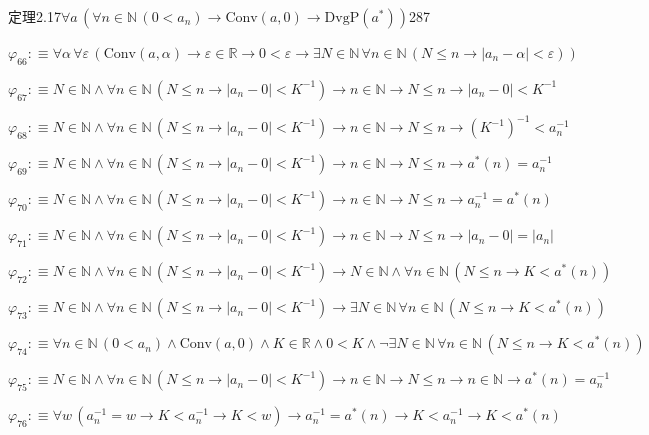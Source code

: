 \begin{fullproof}{定理2.17}{$\forall a\,(\forall n \in \mathbb{N}\,(0 < a_{n}) \to \mathrm{Conv}(a,0) \to \mathrm{DvgP}(a^{\ast}))$}{287}
\begin{abbrevlist}
\item $\varphi_{66} :\equiv \forall \alpha\,\forall \varepsilon\,(\mathrm{Conv}(a,\alpha) \to \varepsilon \in \mathbb{R} \to 0 < \varepsilon \to \exists N \in \mathbb{N}\,\forall n \in \mathbb{N}\,(N \leq n \to \lvert a_{n} - \alpha \rvert < \varepsilon))$
\item $\varphi_{67} :\equiv N \in \mathbb{N} \land \forall n \in \mathbb{N}\,(N \leq n \to \lvert a_{n} - 0 \rvert < K^{-1}) \to n \in \mathbb{N} \to N \leq n \to \lvert a_{n} - 0 \rvert < K^{-1}$
\item $\varphi_{68} :\equiv N \in \mathbb{N} \land \forall n \in \mathbb{N}\,(N \leq n \to \lvert a_{n} - 0 \rvert < K^{-1}) \to n \in \mathbb{N} \to N \leq n \to (K^{-1})^{-1} < a_{n}^{-1}$
\item $\varphi_{69} :\equiv N \in \mathbb{N} \land \forall n \in \mathbb{N}\,(N \leq n \to \lvert a_{n} - 0 \rvert < K^{-1}) \to n \in \mathbb{N} \to N \leq n \to a^{\ast}(n) = a_{n}^{-1}$
\item $\varphi_{70} :\equiv N \in \mathbb{N} \land \forall n \in \mathbb{N}\,(N \leq n \to \lvert a_{n} - 0 \rvert < K^{-1}) \to n \in \mathbb{N} \to N \leq n \to a_{n}^{-1} = a^{\ast}(n)$
\item $\varphi_{71} :\equiv N \in \mathbb{N} \land \forall n \in \mathbb{N}\,(N \leq n \to \lvert a_{n} - 0 \rvert < K^{-1}) \to n \in \mathbb{N} \to N \leq n \to \lvert a_{n} - 0 \rvert = \lvert a_{n} \rvert$
\item $\varphi_{72} :\equiv N \in \mathbb{N} \land \forall n \in \mathbb{N}\,(N \leq n \to \lvert a_{n} - 0 \rvert < K^{-1}) \to N \in \mathbb{N} \land \forall n \in \mathbb{N}\,(N \leq n \to K < a^{\ast}(n))$
\item $\varphi_{73} :\equiv N \in \mathbb{N} \land \forall n \in \mathbb{N}\,(N \leq n \to \lvert a_{n} - 0 \rvert < K^{-1}) \to \exists N \in \mathbb{N}\,\forall n \in \mathbb{N}\,(N \leq n \to K < a^{\ast}(n))$
\item $\varphi_{74} :\equiv \forall n \in \mathbb{N}\,(0 < a_{n}) \land \mathrm{Conv}(a,0) \land K \in \mathbb{R} \land 0 < K \land \neg \exists N \in \mathbb{N}\,\forall n \in \mathbb{N}\,(N \leq n \to K < a^{\ast}(n))$
\item $\varphi_{75} :\equiv N \in \mathbb{N} \land \forall n \in \mathbb{N}\,(N \leq n \to \lvert a_{n} - 0 \rvert < K^{-1}) \to n \in \mathbb{N} \to N \leq n \to n \in \mathbb{N} \to a^{\ast}(n) = a_{n}^{-1}$
\item $\varphi_{76} :\equiv \forall w\,(a_{n}^{-1} = w \to K < a_{n}^{-1} \to K < w) \to a_{n}^{-1} = a^{\ast}(n) \to K < a_{n}^{-1} \to K < a^{\ast}(n)$

\end{abbrevlist}
\end{fullproof}
